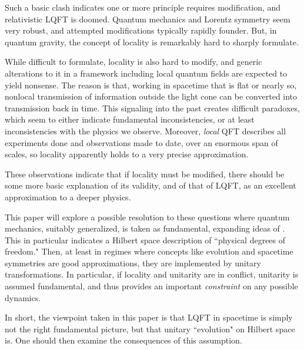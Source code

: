 Such a basic clash indicates one or more principle requires modification, and relativistic LQFT is doomed.  Quantum mechanics and Lorentz symmetry seem very robust, and attempted modifications typically rapidly founder.  But, in quantum gravity, the concept of locality is remarkably hard to sharply formulate.

While difficult to formulate, locality is also hard to modify, and generic alterations to it in a framework including local quantum fields are expected to yield nonsense.  The reason is that, working in spacetime that is flat or nearly so, nonlocal transmission of information outside the light cone can be converted into transmission back in time.  This signaling into the past creates difficult paradoxes, which  seem to either indicate fundamental inconsistencies, or at least inconsistencies with the physics we observe.  Moreover, {\it local} QFT describes all experiments done and observations made to date, over an enormous span of scales, so locality apparently holds to a very precise approximation.

These observations indicate that if locality must be modified, there should be some more basic explanation of its validity, and of that of LQFT, as an excellent approximation to a deeper physics.

This paper will explore a possible resolution to these questions where quantum mechanics, suitably generalized,  is taken  as fundamental, expanding ideas of \ModelsU.  This in particular indicates a Hilbert space description of ``physical degrees of freedom."  Then, at least in regimes where concepts like evolution and spacetime symmetries are good approximations, they are implemented by unitary transformations.  In particular, if locality and unitarity are in conflict, unitarity is assumed fundamental, and thus provides an important {\it constraint} on any possible dynamics.

In short, the viewpoint taken in this paper is that LQFT in spacetime is simply not the right fundamental picture, but that unitary ``evolution" on Hilbert space is.  One should then examine the consequences of this assumption.

